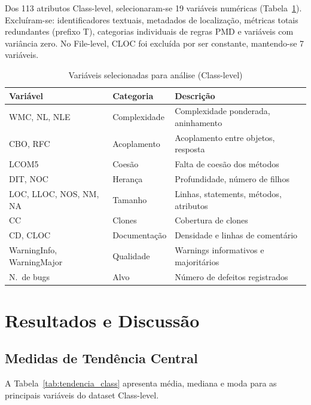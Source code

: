 \documentclass[12pt]{article}
\begin{document}
Dos 113 atributos Class-level, selecionaram-se 19 variáveis numéricas (Tabela~\ref{tab:selecao}). Excluíram-se: identificadores textuais, metadados de localização, métricas totais redundantes (prefixo T), categorias individuais de regras PMD e variáveis com variância zero. No File-level, CLOC foi excluída por ser constante, mantendo-se 7 variáveis.

\begin{table}[H]
\centering
\caption{Variáveis selecionadas para análise (Class-level)}
\label{tab:selecao}
\footnotesize
\begin{tabular}{llp{4.5cm}}
\toprule
\textbf{Variável} & \textbf{Categoria} & \textbf{Descrição} \\
\midrule
WMC, NL, NLE      & Complexidade & Complexidade ponderada, aninhamento \\
CBO, RFC          & Acoplamento  & Acoplamento entre objetos, resposta \\
LCOM5             & Coesão       & Falta de coesão dos métodos \\
DIT, NOC          & Herança      & Profundidade, número de filhos \\
LOC, LLOC, NOS, NM, NA & Tamanho & Linhas, statements, métodos, atributos \\
CC                & Clones       & Cobertura de clones \\
CD, CLOC          & Documentação & Densidade e linhas de comentário \\
WarningInfo, WarningMajor & Qualidade & Warnings informativos e majoritários \\
N.\ de bugs       & Alvo         & Número de defeitos registrados \\
\bottomrule
\end{tabular}
\end{table}

\section{Resultados e Discussão} \label{sec:resultados}

\subsection{Medidas de Tendência Central}

A Tabela~\ref{tab:tendencia_class} apresenta média, mediana e moda para as principais variáveis do dataset Class-level.
\end{document}
